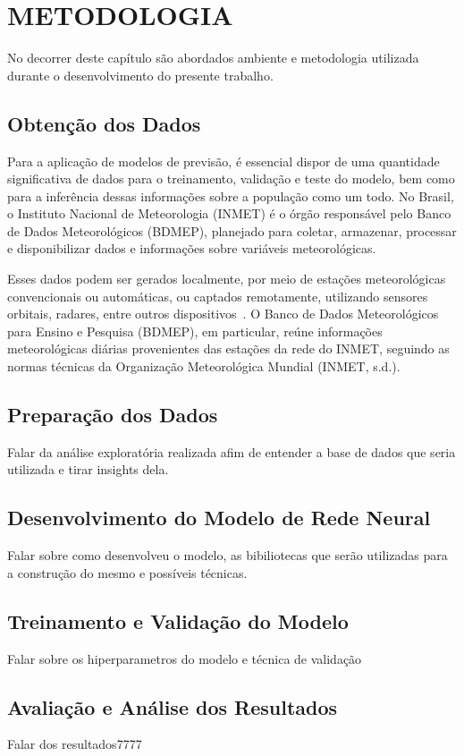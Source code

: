 \chapter{METODOLOGIA}

No decorrer deste capítulo são abordados ambiente e metodologia utilizada durante o
desenvolvimento do presente trabalho.

\section{Obtenção dos Dados}

    Para a aplicação de modelos de previsão, é essencial dispor de uma quantidade significativa de dados para o 
    treinamento, validação e teste do modelo, bem como para a inferência dessas informações sobre a população como um 
    todo. No Brasil, o Instituto Nacional de Meteorologia (INMET) é o órgão responsável pelo Banco de Dados 
    Meteorológicos (BDMEP), planejado para coletar, armazenar, processar e disponibilizar dados e informações sobre 
    variáveis meteorológicas. 

    Esses dados podem ser gerados localmente, por meio de estações meteorológicas convencionais ou automáticas, 
    ou captados remotamente, utilizando sensores orbitais, radares, entre outros dispositivos~\cite{vianna2017}. 
    O Banco de Dados Meteorológicos para Ensino e Pesquisa (BDMEP), em particular, reúne informações meteorológicas 
    diárias provenientes das estações da rede do INMET, seguindo as normas técnicas da Organização Meteorológica 
    Mundial (INMET, s.d.).

\section{Preparação dos Dados}
    Falar da análise exploratória realizada afim de entender a base de dados que seria utilizada e tirar
    insights dela.

\section{Desenvolvimento do Modelo de Rede Neural}
    Falar sobre como desenvolveu o modelo, as bibiliotecas que serão utilizadas para a construção do mesmo
    e possíveis técnicas.
\section{Treinamento e Validação do Modelo}
    Falar sobre os hiperparametros do modelo e técnica de validação
\section{Avaliação e Análise dos Resultados}
    Falar dos resultados7777
